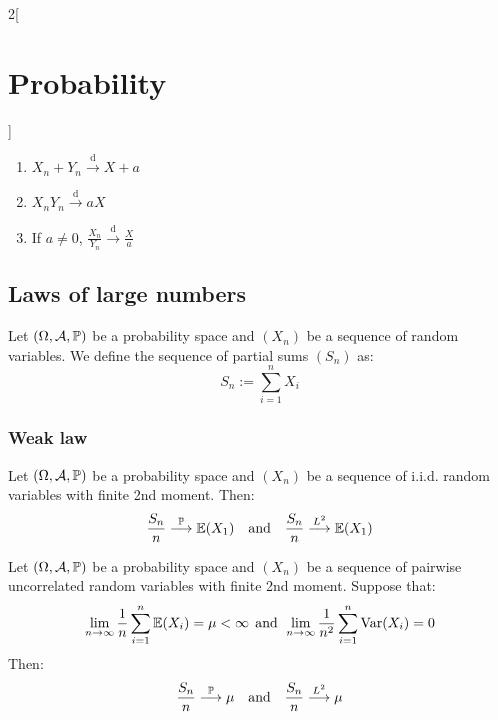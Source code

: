 \documentclass[../../../main.tex]{subfiles}
\begin{document}
\begin{multicols}{2}[\section{Probability}]
\begin{theorem}
    \begin{enumerate}
      \item $X_n+Y_n\overset{\text{d}}{\longrightarrow} X+ a$
      \item $X_nY_n\overset{\text{d}}{\longrightarrow} aX$
      \item If $a\ne 0$, $\frac{X_n}{Y_n}\overset{\text{d}}{\longrightarrow} \frac{X}{a}$
    \end{enumerate}
  \end{theorem}
  \subsection{Laws of large numbers}
  \begin{definition}
    Let $(\Omega,\mathcal{A},\mathbb{P})$ be a probability space and $(X_n)$ be a sequence of random variables. We define the sequence of partial sums $(S_n)$ as: $$S_n:=\sum_{i=1}^nX_i$$
  \end{definition}
  \subsubsection{Weak law}
  \begin{theorem}
    Let $(\Omega,\mathcal{A},\mathbb{P})$ be a probability space and $(X_n)$ be a sequence of i.i.d. random variables with finite 2nd moment. Then: $$\frac{S_n}{n}\overset{\mathbb{P}}{\longrightarrow}\mathbb{E}(X_1)\quad\text{and}\quad\frac{S_n}{n}\overset{L^2}{\longrightarrow}\mathbb{E}(X_1)$$
  \end{theorem}
  \begin{theorem}
    Let $(\Omega,\mathcal{A},\mathbb{P})$ be a probability space and $(X_n)$ be a sequence of pairwise uncorrelated random variables with finite 2nd moment. Suppose that: $$\lim_{n\to\infty}\frac{1}{n}\sum_{i=1}^n\mathbb{E}(X_i)=\mu<\infty\;\,\text{and}\;\,\lim_{n\to\infty}\frac{1}{n^2}\sum_{i=1}^n\operatorname{Var}(X_i)=0$$ Then: $$\frac{S_n}{n}\overset{\mathbb{P}}{\longrightarrow}\mu\quad\text{and}\quad\frac{S_n}{n}\overset{L^2}{\longrightarrow}\mu$$
  \end{theorem}

\end{multicols}
\end{document}
